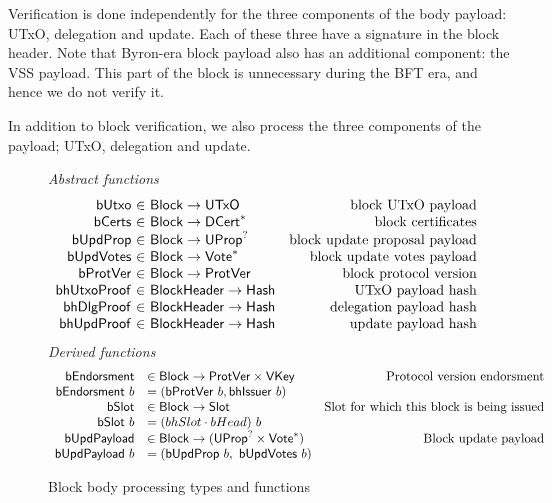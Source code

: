 \documentclass[11pt,a4paper]{article}
\newcommand{\fun}[1]{\mathsf{#1}}
\newcommand{\type}[1]{\mathsf{#1}}
\newcommand{\seqof}[1]{#1^{*}}
\newcommand{\totalf}{\to}
\newcommand{\Hash}{\type{Hash}}  %
\newcommand{\Slot}{\type{Slot}}
\newcommand{\Block}{\type{Block}}
\newcommand{\DCert}{\type{DCert}}
\newcommand{\VKey}{\type{VKey}}
\newcommand{\bcertsname}{bCerts}
\newcommand{\bhissuername}{bhIssuer}
\newcommand{\bhissuer}[1]{\fun{\bhissuername} ~ #1}
\begin{document}
Verification is done independently for the three components of the body payload:
UTxO, delegation and update. Each of these three have a signature in the block
header. Note that Byron-era block payload also has an additional component: the
VSS payload. This part of the block is unnecessary during the BFT era, and hence
we do not verify it.

In addition to block verification, we also process the three components of the
payload; UTxO, delegation and update.

\begin{figure}[ht]
  \emph{Abstract functions}
  \begin{equation*}
    \begin{array}{r@{~\in~}lr}
      \fun{bUtxo} & \Block \totalf \UTxO & \text{block UTxO payload} \\
      \fun{\bcertsname} & \Block \totalf \seqof{\DCert}
                                         & \text{block certificates} \\
      \fun{bUpdProp} & \Block \totalf \UProp^{?} & \text{block update proposal payload} \\
      \fun{bUpdVotes} & \Block \totalf \seqof{\Vote} & \text{block update votes payload} \\
      \fun{bProtVer} & \Block \totalf \ProtVer & \text{block protocol version} \\
      \fun{bhUtxoProof} & \Bhead \totalf \Hash & \text{UTxO payload hash} \\
      \fun{bhDlgProof} & \Bhead \totalf \Hash & \text{delegation payload hash} \\
      \fun{bhUpdProof} & \Bhead \totalf \Hash & \text{update payload hash} \\
    \end{array}
  \end{equation*}
  \emph{Derived functions}
  \begin{equation*}
    \begin{array}{rlr}
      \fun{bEndorsment} & \in \Block \to \ProtVer \times \VKey & \text{Protocol version endorsment} \\
      \bendorsment{b} & = (\bprotver{b}, \bhissuer{b}) \\
      \fun{\bslotname} & \in \Block \to \Slot & \text{Slot for which this block is being issued} \\
      \bslot{b} & = (\bhslotname \cdot \bheadname)~b \\
      \fun{\bupdpayloadname} & \in \Block \to (\UProp^{?}\times\seqof{\Vote}) & \text{Block update payload} \\
      \bupdpayload{b} & = (\bupdprop{b},~\bupdvotes{b})
    \end{array}
  \end{equation*}
  \caption{Block body processing types and functions}
  \label{fig:defs:bbody}
\end{figure}
\end{document}
